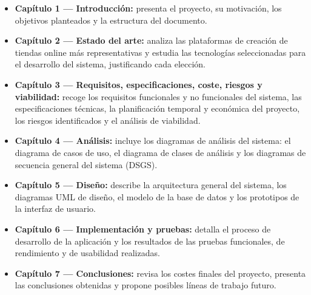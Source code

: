 \begin{itemize}
    \item \textbf{Capítulo 1 — Introducción:} presenta el proyecto, su motivación, los objetivos planteados y la estructura del documento.
    \item \textbf{Capítulo 2 — Estado del arte:} analiza las plataformas de creación de tiendas online más representativas y estudia las tecnologías seleccionadas para el desarrollo del sistema, justificando cada elección.
    \item \textbf{Capítulo 3 — Requisitos, especificaciones, coste, riesgos y viabilidad:} recoge los requisitos funcionales y no funcionales del sistema, las especificaciones técnicas, la planificación temporal y económica del proyecto, los riesgos identificados y el análisis de viabilidad.
    \item \textbf{Capítulo 4 — Análisis:} incluye los diagramas de análisis del sistema: el diagrama de casos de uso, el diagrama de clases de análisis y los diagramas de secuencia general del sistema (DSGS).
    \item \textbf{Capítulo 5 — Diseño:} describe la arquitectura general del sistema, los diagramas UML de diseño, el modelo de la base de datos y los prototipos de la interfaz de usuario.
    \item \textbf{Capítulo 6 — Implementación y pruebas:} detalla el proceso de desarrollo de la aplicación y los resultados de las pruebas funcionales, de rendimiento y de usabilidad realizadas.
    \item \textbf{Capítulo 7 — Conclusiones:} revisa los costes finales del proyecto, presenta las conclusiones obtenidas y propone posibles líneas de trabajo futuro.
\end{itemize}
